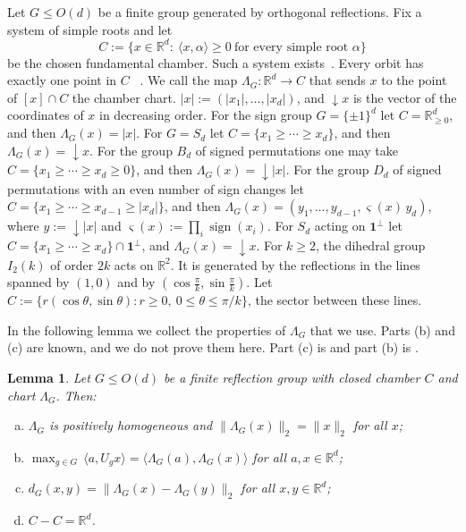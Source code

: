 \documentclass[11pt]{article}
\newcommand{\R}{\mathbb{R}}
\newcommand{\inner}[2]{\langle #1, #2 \rangle}
\newtheorem{lem}[theor]{Lemma}
\theoremstyle{definition}
\begin{document}
Let $G\le O(d)$ be a finite group generated by orthogonal reflections. Fix a
system of simple roots and let
\[
C:=\bigl\{x\in\R^d:\ \inner{x}{\alpha}\ge0\ \text{for every simple root }\alpha\bigr\}
\]
be the chosen fundamental chamber. Such a system
exists~\cite[Thm.~1.3]{humphreys}. Every orbit has  exactly one
point in $C$  ~\cite[Thm.~1.12]{humphreys}. We call the map $\Lambda_G:\R^d\to C$ that
sends $x$ to the  point of $[x]\cap C$ the chamber chart. 
$|x|:=(|x_1|,\dots,|x_d|)$, and ${\downarrow}x$ is the vector of the coordinates of
$x$ in decreasing order. For the sign group $G=\{\pm1\}^d$ let
$C=\R_{\ge0}^d$, and then $\Lambda_G(x)=|x|$. For $G=S_d$ let
$C=\{x_1\ge\cdots\ge x_d\}$, and then $\Lambda_G(x)={\downarrow}x$. For the group
$B_d$ of signed permutations one may take $C=\{x_1\ge\cdots\ge x_d\ge0\}$, and then
$\Lambda_G(x)={\downarrow}|x|$. For the group $D_d$ of signed permutations with an even
number of sign changes let $C=\{x_1\ge\cdots\ge x_{d-1}\ge|x_d|\}$, and then
$\Lambda_G(x)=(y_1,\dots,y_{d-1},\varsigma(x)\,y_d)$, where $y:={\downarrow}|x|$ and
$\varsigma(x):=\prod_i\operatorname{sign}(x_i)$. For $S_d$ acting on $\mathbf 1^{\perp}$ let $C=\{x_1\ge\cdots\ge x_d\}\cap\mathbf 1^{\perp}$, and  $\Lambda_G(x)={\downarrow}x$.
For $k\ge2$, the dihedral group $I_2(k)$ of order $2k$ acts on $\R^2$. It is generated by
the reflections in the lines spanned by $(1,0)$ and by $(\cos\frac\pi k,\sin\frac\pi k)$.
Let $C:=\{r(\cos\theta,\sin\theta): r\ge0,\ 0\le\theta\le\pi/k\}$, the
sector between these lines.

In the following lemma we collect the properties of $\Lambda_G$ that we use. 
Parts (b) and (c) are known, and we do not prove them here. Part (c) is \cite[Lem.~8]{mixonpacker} and part (b)
is \cite[eq.~(2)]{mixonpacker}. 
\begin{lem}
	\label{lem:chamber-chart}
	Let $G\le O(d)$ be a finite reflection group with closed chamber $C$ and
	chart $\Lambda_G$. Then:
	\begin{enumerate}[(a)]
		\item $\Lambda_G$ is positively homogeneous and
		$\|\Lambda_G(x)\|_2=\|x\|_2$ for all $x$;
		\item $\displaystyle\max_{g\in G}\,\inner{a}{U_gx}
		=\bigl\langle\Lambda_G(a),\Lambda_G(x)\bigr\rangle$
		for all $a,x\in\R^d$;
		\item $d_G(x,y)=\bigl\|\Lambda_G(x)-\Lambda_G(y)\bigr\|_2$
		for all $x,y\in\R^d$;
		\item $C-C=\R^d$.
	\end{enumerate}
\end{lem}
\end{document}
